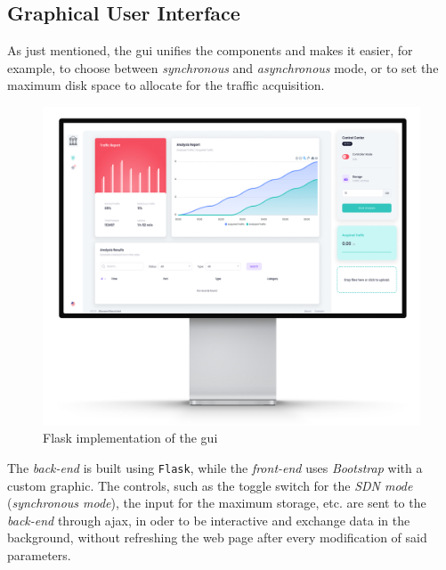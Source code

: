 
\subsection{Graphical User Interface}
\label{subsec:gui}

As just mentioned, the \gls{gui} unifies the components and makes it easier, for example, to choose between \textit{synchronous} and \textit{asynchronous} mode, or to set the maximum disk space to allocate for the traffic acquisition.

\begin{figure}[h!]
    \centering
    \includegraphics[scale=0.4]{assets/figures/chapter3/gui-mockup.png}
    \caption{Flask implementation of the \gls{gui}}
    \label{fig:gui-mockup}
\end{figure}

\par The \textit{back-end} is built using \texttt{Flask}, while the \textit{front-end} uses \textit{Bootstrap} \cite{BootstrapLibrary} with a custom graphic. The controls, such as the toggle switch for the \textit{SDN mode} (\textit{synchronous mode}), the input for the maximum storage, etc. are sent to the \textit{back-end} through \gls{ajax}, in oder to be interactive and exchange data in the background, without refreshing the web page after every modification of said parameters.

